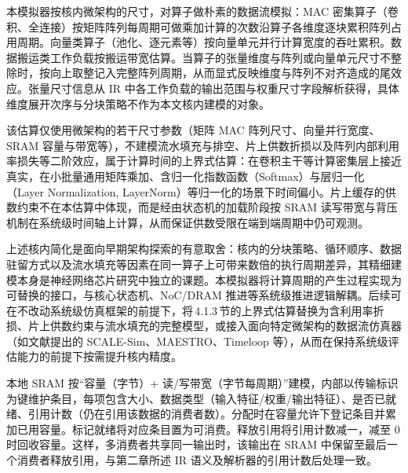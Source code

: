 本模拟器按核内微架构的尺寸，对算子做朴素的数据流模拟：MAC 密集算子（卷积、全连接）按矩阵阵列每周期可做乘加计算的次数沿算子各维度逐块累积阵列占用周期。向量类算子（池化、逐元素等）按向量单元并行计算宽度的吞吐累积。数据搬运类工作负载按搬运带宽估算。当算子的张量维度与阵列或向量单元尺寸不整除时，按向上取整记入完整阵列周期，从而显式反映维度与阵列不对齐造成的尾效应。张量尺寸信息从 IR 中各工作负载的输出范围与权重尺寸字段解析获得，具体维度展开次序与分块策略不作为本文核内建模的对象。

该估算仅使用微架构的若干尺寸参数（矩阵 MAC 阵列尺寸、向量并行宽度、SRAM 容量与带宽等），不建模流水填充与排空、片上供数折损以及阵列内部利用率损失等二阶效应，属于计算时间的上界式估算：在卷积主干等计算密集层上接近真实，在小批量通用矩阵乘加、含归一化指数函数（Softmax）与层归一化（Layer Normalization, LayerNorm）等归一化的场景下时间偏小。片上缓存的供数约束不在本估算中体现，而是经由状态机的加载阶段按 SRAM 读写带宽与背压机制在系统级时间轴上计算，从而保证供数受限在端到端周期中仍可观测。

上述核内简化是面向早期架构探索的有意取舍：核内的分块策略、循环顺序、数据驻留方式以及流水填充等因素在同一算子上可带来数倍的执行周期差异，其精细建模本身是神经网络芯片研究中独立的课题\parencite{chen2016eyeriss,kwon2019maestro,parashar2019timeloop}。本模拟器将计算周期的产生过程实现为可替换的接口，与核心状态机、NoC/DRAM 推进等系统级推进逻辑解耦。后续可在不改动系统级仿真框架的前提下，将\,4.1.3\,节的上界式估算替换为含利用率折损、片上供数约束与流水填充的完整模型，或接入面向特定微架构的数据流仿真器（如文献\parencite{samajdar2020scalesim,kwon2019maestro,parashar2019timeloop}提出的 SCALE-Sim、MAESTRO、Timeloop 等），从而在保持系统级评估能力的前提下按需提升核内精度。


本地 SRAM 按“容量（字节）+ 读/写带宽（字节每周期）”建模，内部以传输标识为键维护条目，每项包含大小、数据类型（输入特征/权重/输出特征）、是否已就绪、引用计数（仍在引用该数据的消费者数）。分配时在容量允许下登记条目并累加已用容量。标记就绪将对应条目置为可消费。释放引用将引用计数减一，减至 0 时回收容量。这样，多消费者共享同一输出时，该输出在 SRAM 中保留至最后一个消费者释放引用，与第二章所述 IR 语义及解析器的引用计数后处理一致。

